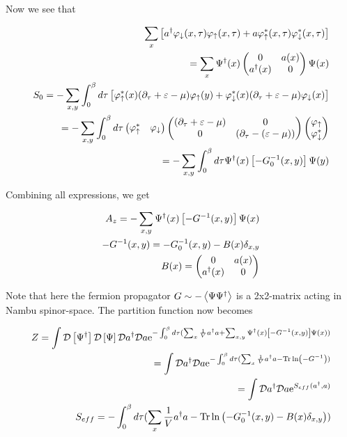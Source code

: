 Now we see that 

\begin{align*}
    \sum_x \left[ a^{\dagger} \varphi_\downarrow(x,\tau) \varphi_\uparrow(x, \tau) + a \varphi_\uparrow^*(x,\tau) \varphi_\downarrow^*(x,\tau) \right] \\ 
    = \sum_x \Psi^{\dagger} (x) \begin{pmatrix} 0 & a(x) \\ a^{\dagger}(x) & 0 \end{pmatrix} \Psi(x) \\ 
    S_0 = -\sum_{x,y} \int_0^\beta d \tau \left[ \varphi_\uparrow^*(x)(\partial_\tau + \varepsilon - \mu)\varphi_\uparrow(y) + \varphi_\downarrow^*(x)(\partial_\tau +\varepsilon - \mu)\varphi_\downarrow(x)\right] \\ 
    = -\sum_{x,y} \int_0^\beta d \tau \begin{pmatrix}\varphi_\uparrow^* & \varphi_\downarrow\end{pmatrix} \begin{pmatrix}(\partial_\tau + \varepsilon - \mu)  & 0 \\ 0 & (\partial_\tau -(\varepsilon - \mu)) \end{pmatrix} \begin{pmatrix}\varphi_\uparrow \\ \varphi_\downarrow^* \end{pmatrix} \\ 
    = -\sum_{x,y} \int_0^\beta d \tau \Psi^{\dagger}(x) \left[ -G_0 ^{-1}(x,y) \right] \Psi(y) 
\end{align*}

Combining all expressions, we get 

\begin{align*}
    A_z = -\sum_{x,y} \Psi^{\dagger}(x)\left[ -G ^{-1}(x,y) \right]\Psi(x) \\
    -G ^{-1}(x,y) = -G_0 ^{-1}(x,y) - B(x)\delta_{x,y} \\ 
    B(x) = \begin{pmatrix} 0 & a(x) \\ a^{\dagger}(x) & 0 \end{pmatrix} 
\end{align*}

Note that here the fermion propagator $G \sim - \expval{\Psi \Psi^{\dagger}}$ is a 2x2-matrix acting in Nambu spinor-space. The partition function now becomes 

\begin{align*}
    Z = \int \mathcal{D} \left[ \Psi^{\dagger}\right] \mathcal{D} \left[\Psi\right]\mathcal{D} a^{\dagger} \mathcal{D} a \mathrm{e}^{ - \int_0^\beta d\tau( \sum_x \frac{1}{V}a^{\dagger} a +\sum_{x,y} \Psi^{\dagger}(x)\left[ -G ^{-1}(x,y) \right]\Psi(x) )} \\ 
    = \int \mathcal{D} a^{\dagger} \mathcal{D} a \mathrm{e}^{- \int_0^\beta d\tau ( \sum_x \frac{1}{V}a^{\dagger} a - \Tr \ln \left(-G ^{-1}\right))} \\ 
    = \int \mathcal{D} a^{\dagger} \mathcal{D} a \mathrm{e}^{S_{eff}(a^{\dagger}, a)} \\ 
    S_{eff} = -\int_0^\beta d \tau (\sum_x  \frac{1}{V}a^{\dagger} a - \Tr \ln \left(-G_0 ^{-1}(x,y) -B(x)\delta_{x,y}\right))
\end{align*}

